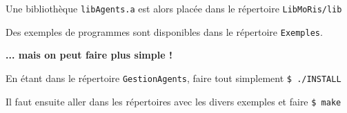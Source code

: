 \documentclass[12pt]{article}
\begin{document}
Une biblioth\`eque {\tt libAgents.a} est alors plac\'ee dans le r\'epertoire
{\tt LibMoRis/lib}

Des exemples de programmes sont disponibles dans le r\'epertoire
{\tt Exemples}.

\vspace{0.5cm}
{\bf ... mais on peut faire plus simple !}

\vspace{0.5cm}

En \'etant dans le r\'epertoire {\tt GestionAgents}, faire tout
simplement {\tt \$ ./INSTALL}

Il faut ensuite aller dans les r\'epertoires avec les divers exemples
et faire {\tt \$ make}
\end{document}
